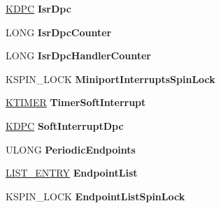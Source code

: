 \begin{DoxyCompactItemize}
\hyperlink{struct___k_d_p_c}{K\+D\+PC} {\bfseries Isr\+Dpc}
\item 
\mbox{\label{struct___u_s_b_p_o_r_t___d_e_v_i_c_e___e_x_t_e_n_s_i_o_n_a0a8dfc237d9e49f354d7f0c6031ab9bf}} 
L\+O\+NG {\bfseries Isr\+Dpc\+Counter}
\item 
\mbox{\label{struct___u_s_b_p_o_r_t___d_e_v_i_c_e___e_x_t_e_n_s_i_o_n_a78a7eeeb3e656753a81e82cfa9b067e1}} 
L\+O\+NG {\bfseries Isr\+Dpc\+Handler\+Counter}
\item 
\mbox{\label{struct___u_s_b_p_o_r_t___d_e_v_i_c_e___e_x_t_e_n_s_i_o_n_abe0852761fd738e2d4514f5c31610cc4}} 
K\+S\+P\+I\+N\+\_\+\+L\+O\+CK {\bfseries Miniport\+Interrupts\+Spin\+Lock}
\item 
\mbox{\label{struct___u_s_b_p_o_r_t___d_e_v_i_c_e___e_x_t_e_n_s_i_o_n_a0dd8849dc97b8b45018536a172e19011}} 
\hyperlink{struct___k_t_i_m_e_r}{K\+T\+I\+M\+ER} {\bfseries Timer\+Soft\+Interrupt}
\item 
\mbox{\label{struct___u_s_b_p_o_r_t___d_e_v_i_c_e___e_x_t_e_n_s_i_o_n_a3764bc71507588660a5c5e274b1a937b}} 
\hyperlink{struct___k_d_p_c}{K\+D\+PC} {\bfseries Soft\+Interrupt\+Dpc}
\item 
\mbox{\label{struct___u_s_b_p_o_r_t___d_e_v_i_c_e___e_x_t_e_n_s_i_o_n_ae016bd0c59819b8b27a614504d169c6d}} 
U\+L\+O\+NG {\bfseries Periodic\+Endpoints}
\item 
\mbox{\label{struct___u_s_b_p_o_r_t___d_e_v_i_c_e___e_x_t_e_n_s_i_o_n_ade75c7141d0852ea3a3c2fb3d6ce0458}} 
\hyperlink{struct___l_i_s_t___e_n_t_r_y}{L\+I\+S\+T\+\_\+\+E\+N\+T\+RY} {\bfseries Endpoint\+List}
\item 
\mbox{\label{struct___u_s_b_p_o_r_t___d_e_v_i_c_e___e_x_t_e_n_s_i_o_n_a7cb644975600754f5348b332643259ce}} 
K\+S\+P\+I\+N\+\_\+\+L\+O\+CK {\bfseries Endpoint\+List\+Spin\+Lock}

\end{DoxyCompactItemize}
